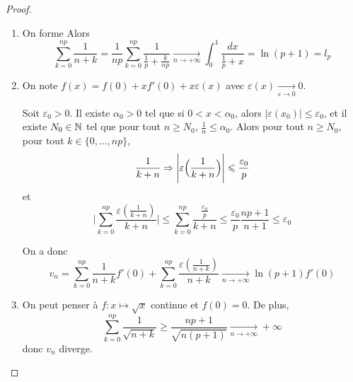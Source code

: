 \documentclass[12pt]{article}
\begin{document}
\begin{proof}
	\phantom{}
	\begin{enumerate}
		\item On forme 
		Alors 
		\begin{equation}\sum_{k=0}^{np}\frac{1}{n+k}=\frac{1}{np}\sum_{k=0}^{np}\frac{1}{\frac{1}{p}+\frac{k}{np}}\xrightarrow[n\to+\infty]{}\int_{0}^{1}\frac{dx}{\frac{1}{p}+x}=\ln(p+1)=l_{p}\end{equation}

		\item On note $f(x)=f(0)+xf'(0)+x\varepsilon(x)$ avec $\varepsilon(x)\xrightarrow[\varepsilon\to0]{}0$. 
		
		Soit $\varepsilon_{0}>0$. Il existe $\alpha_{0}>0$ tel que si $0<x<\alpha_{0}$, alors $\vert\varepsilon(x_{0})\vert\leqslant\varepsilon_{0}$, et il existe $N_{0}\in\mathbb{N}$ tel que pour tout $n\geqslant N_{0}$, $\frac{1}{n}\leqslant\alpha_{0}$. Alors pour tout $n\geqslant N_{0}$, pour tout $k\in\{0,\dots,np\}$, 
		\begin{equation}\frac{1}{k+n}\Rightarrow \Biggl\vert\varepsilon\Bigl(\frac{1}{k+n}\Bigr)\Biggr\vert\leqslant\frac{\varepsilon_{0}}{p}\end{equation}
		et
		\begin{equation}\Biggl\vert\sum_{k=0}^{np}\frac{\varepsilon(\frac{1}{k+n})}{k+n}\Biggr\vert\leqslant\sum_{k=0}^{np}\frac{\frac{\varepsilon_{0}}{p}}{k+n}\leqslant\frac{\varepsilon_{0}}{p}\frac{np+1}{n+1}\leqslant\varepsilon_{0}\end{equation}

		On a donc
		\begin{equation}v_{n}=\sum_{k=0}^{np}\frac{1}{n+k}f'(0)+\sum_{k=0}^{np}\frac{\varepsilon(\frac{1}{n+k})}{n+k}\xrightarrow[n\to+\infty]{}\ln(p+1)f'(0)\end{equation}

		\item On peut penser à $f\colon x\mapsto\sqrt{x}$ continue et $f(0)=0$. De plus,
		\begin{equation}\sum_{k=0}^{np}\frac{1}{\sqrt{n+k}}\geqslant\frac{np+1}{\sqrt{n(p+1)}}\xrightarrow[n\to+\infty]{}+\infty\end{equation}
		donc $v_{n}$ diverge.


\end{enumerate}
\end{proof}
\end{document}
